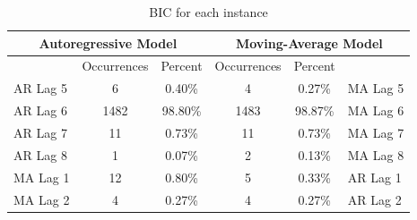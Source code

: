 \documentclass[oneside,12pt,openany]{book}
\begin{document}
			\begin{table}[!ht]
			\centering
			\begin{tabular}{|l|c|c|c|c|l|}
				\hline
				\multicolumn{3}{|c|}{Autoregressive Model} & \multicolumn{3}{c|}{Moving-Average Model} \\ \hline
				\cellcolor{black} & Occurrences & Percent & Occurrences & Percent & \cellcolor{black} \\ \hline
				AR Lag 5 & 6 & 0.40\% & 4 & 0.27\% & MA Lag 5 \\ \hline
				AR Lag 6 & 1482 & 98.80\% & 1483 & 98.87\% & MA Lag 6 \\ \hline
				AR Lag 7 & 11 & 0.73\% & 11 & 0.73\% & MA Lag 7 \\ \hline
				AR Lag 8 & 1 & 0.07\% & 2 & 0.13\% & MA Lag 8 \\ \hline
				MA Lag 1 & 12 & 0.80\% & 5 & 0.33\% & AR Lag 1 \\ \hline
				MA Lag 2 & 4 & 0.27\% & 4 & 0.27\% & AR Lag 2 \\ \hline
			\end{tabular}
			\caption{BIC for each instance}
		\end{table}
		
\end{document}
